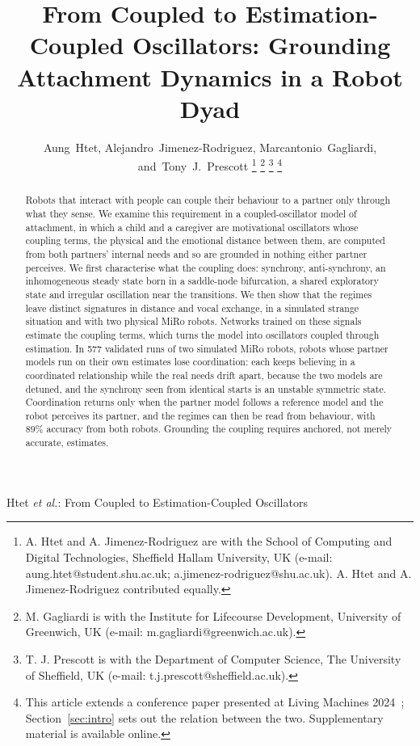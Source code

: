 \documentclass[journal]{IEEEtran}
\begin{document}
\title{From Coupled to Estimation-Coupled Oscillators: Grounding Attachment Dynamics in a Robot Dyad}

\author{Aung~Htet,
        Alejandro~Jimenez-Rodriguez,
        Marcantonio~Gagliardi,
        and~Tony~J.~Prescott%
\thanks{A. Htet and A. Jimenez-Rodriguez are with the School of Computing and Digital Technologies, Sheffield Hallam University, UK (e-mail: aung.htet@student.shu.ac.uk; a.jimenez-rodriguez@shu.ac.uk). A. Htet and A. Jimenez-Rodriguez contributed equally.}%
\thanks{M. Gagliardi is with the Institute for Lifecourse Development, University of Greenwich, UK (e-mail: m.gagliardi@greenwich.ac.uk).}%
\thanks{T. J. Prescott is with the Department of Computer Science, The University of Sheffield, UK (e-mail: t.j.prescott@sheffield.ac.uk).}%
\thanks{This article extends a conference paper presented at Living Machines 2024~\cite{Htet2024}; Section~\ref{sec:intro} sets out the relation between the two. Supplementary material is available online.}}

%
{Htet \MakeLowercase{\textit{et al.}}: From Coupled to Estimation-Coupled Oscillators}

\maketitle

\begin{abstract}
Robots that interact with people can couple their behaviour to a partner only through what they sense. We examine this requirement in a coupled-oscillator model of attachment, in which a child and a caregiver are motivational oscillators whose coupling terms, the physical and the emotional distance between them, are computed from both partners' internal needs and so are grounded in nothing either partner perceives. We first characterise what the coupling does: synchrony, anti-synchrony, an inhomogeneous steady state born in a saddle-node bifurcation, a shared exploratory state and irregular oscillation near the transitions. We then show that the regimes leave distinct signatures in distance and vocal exchange, in a simulated strange situation and with two physical MiRo robots. Networks trained on these signals estimate the coupling terms, which turns the model into oscillators coupled through estimation. In 577 validated runs of two simulated MiRo robots, robots whose partner models run on their own estimates lose coordination: each keeps believing in a coordinated relationship while the real needs drift apart, because the two models are detuned, and the synchrony seen from identical starts is an unstable symmetric state. Coordination returns only when the partner model follows a reference model and the robot perceives its partner, and the regimes can then be read from behaviour, with 89\% accuracy from both robots. Grounding the coupling requires anchored, not merely accurate, estimates.
\end{abstract}
\end{document}

